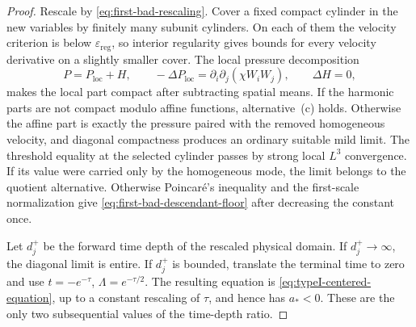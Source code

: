 \documentclass[11pt]{amsart}
\numberwithin{equation}{section}
\theoremstyle{plain}
\theoremstyle{definition}
\theoremstyle{remark}
\begin{document}
\begin{proof}
Rescale by \eqref{eq:first-bad-rescaling}.  Cover a fixed compact cylinder in
the new variables by finitely many subunit cylinders.  On each of them the
velocity criterion is below \(\varepsilon_{\mathrm{reg}}\), so interior
regularity gives bounds for every velocity derivative on a slightly smaller
cover.  The local pressure decomposition
\[
 P=P_{\mathrm{loc}}+H,
 \qquad -\Delta P_{\mathrm{loc}}
 =\partial_i\partial_j(\chi W_iW_j),
 \qquad \Delta H=0,
\]
makes the local part compact after subtracting spatial means.  If the harmonic
parts are not compact modulo affine functions, alternative~\textup{(c)}
holds.  Otherwise the affine part is exactly the pressure paired with the
removed homogeneous velocity, and diagonal compactness produces an ordinary
suitable mild limit.  The threshold equality at the selected cylinder passes
by strong local \(L^3\) convergence.  If its value were carried only by the
homogeneous mode, the limit belongs to the quotient alternative.  Otherwise
Poincar\'e's inequality and the first-scale normalization give
\eqref{eq:first-bad-descendant-floor} after decreasing the constant once.

Let \(d_j^+\) be the forward time depth of the rescaled physical domain.  If
\(d_j^+\to\infty\), the diagonal limit is entire.  If \(d_j^+\) is bounded,
translate the terminal time to zero and use
\(t=-e^{-\tau}\), \(\Lambda=e^{-\tau/2}\).  The resulting equation is
\eqref{eq:typeI-centered-equation}, up to a constant rescaling of \(\tau\),
and hence has \(a_*<0\).  These are the only two subsequential values of the
time-depth ratio.
\end{proof}
\end{document}
